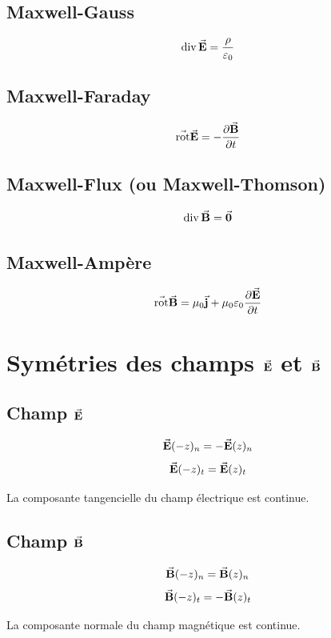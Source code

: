 \documentclass[a4paper,12pt]{article}
\newcommand{\rot}{\va{\operatorname{rot}}}
\renewcommand{\div}{\operatorname{div}}
\begin{document}
        \subsection{Maxwell-Gauss}
                
            $$ \div{\va{E}} =  \frac{\rho}{\varepsilon_0} $$

        \subsection{Maxwell-Faraday}

            $$ \rot{\va{E}} = -\pdv{\va{B}}{t} $$
        
        \subsection{Maxwell-Flux (ou Maxwell-Thomson)}

            $$ \div{\va{B}} = \va{0} $$
        
        \subsection{Maxwell-Ampère}
                
            $$ \rot{\va{B}} = \mu_0 \va{j} + \mu_0 \varepsilon_0 \pdv{\va{E}}{t} $$

    \section{Symétries des champs $\va{E}$ et $\va{B}$}

        \subsection{Champ $\va{E}$}
                
            $$ \va{E}(-z)_n = -\va{E}(z)_n $$
            $$ \va{E}(-z)_t = \va{E}(z)_t $$

            La composante tangencielle du champ électrique est continue.

        \subsection{Champ $\va{B}$}

            $$ \va{B}(-z)_n = \va{B}(z)_n $$
            $$ \va{B}(-z)_t = -\va{B}(z)_t $$

            La composante normale du champ magnétique est continue.
\end{document}
